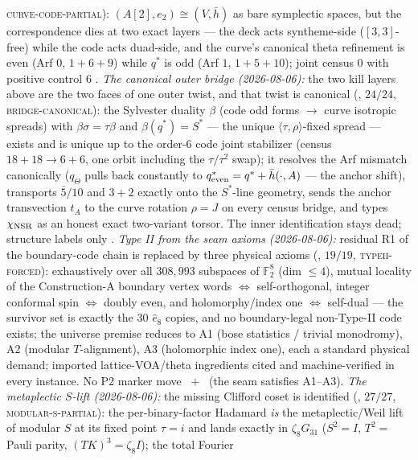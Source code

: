 \textsc{curve-code-partial}): $(A[2],e_2)\cong(V,\bar h)$ as bare
symplectic spaces, but the correspondence dies at two exact layers
--- the deck acts syntheme-side ($[3,3]$-free) while the code acts
duad-side, and the curve's canonical theta refinement is even
(Arf $0$, $1{+}6{+}9$) while $q^{*}$ is odd (Arf $1$,
$1{+}5{+}10$); joint census $0$ with positive control $6$ \mE.
\emph{The canonical outer bridge (2026-08-06):} the two kill
layers above are the two faces of one outer twist, and that twist
is canonical
(, $24/24$,
\textsc{bridge-canonical}): the Sylvester duality $\beta$ (code odd
forms $\to$ curve isotropic spreads) with
$\beta\sigma=\tau\beta$ and $\beta(q^{*})=S^{*}$ --- the unique
$\langle\tau,\rho\rangle$-fixed spread --- exists and is unique up
to the order-6 code joint stabilizer (census $18+18\to6+6$, one
orbit including the $\tau/\tau^2$ swap); it resolves the Arf
mismatch canonically ($q_{\Theta}$ pulls back constantly to
$q^{*}_{\rm even}=q^{*}+\bar h(\cdot,A)$ --- the anchor shift),
transports $\bar5/10$ and $3{+}2$ exactly onto the $S^{*}$-line
geometry, sends the anchor transvection $t_A$ to the curve
rotation $\rho=J$ on every census bridge, and types
$\chi_{\rm NSR}$ as an honest exact two-variant torsor.  The inner
identification stays dead; structure labels only \mE.
\emph{Type II from the seam axioms (2026-08-06):} residual R1 of
the boundary-code chain is replaced by three physical axioms
(, $19/19$,
\textsc{typeii-forced}): exhaustively over all $308{,}993$
subspaces of $\mathbb F_2^8$ (dim $\le4$), mutual locality of the
Construction-A boundary vertex words $\iff$ self-orthogonal,
integer conformal spin $\iff$ doubly even, and holomorphy/index
one $\iff$ self-dual --- the survivor set is exactly the $30$
$\hat e_8$ copies, and no boundary-legal non-Type-II code exists;
the universe premise reduces to A1 (bose statistics / trivial
monodromy), A2 (modular $T$-alignment), A3 (holomorphic index
one), each a standard physical demand; imported lattice-VOA/theta
ingredients cited and machine-verified in every instance.  No P2
marker move \mE\ $+$ \mC\ (the seam satisfies A1--A3).
\emph{The metaplectic $S$-lift (2026-08-06):} the missing Clifford
coset is identified
(, $27/27$,
\textsc{modular-s-partial}): the per-binary-factor Hadamard
\emph{is} the metaplectic/Weil lift of modular $S$ at its fixed
point $\tau=i$ and lands exactly in $\zeta_8G_{31}$ ($S^2=I$,
$T^2=$ Pauli parity, $(TK)^3=\zeta_8I$); the total Fourier
